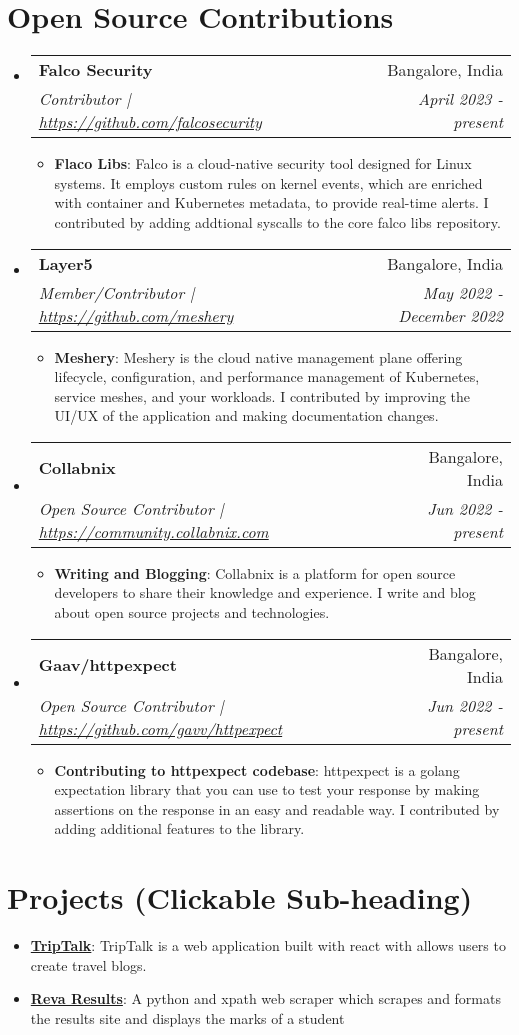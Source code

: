 \documentclass[letterpaper,11pt]{article}
\makeatletter
\newcommand{\resumeItem}[2]{
  \item\small{
    \textbf{#1}{: #2 \vspace{-2pt}}
  }
}
\newcommand{\resumeSubheading}[4]{
  \vspace{-1pt}\item
    \begin{tabular*}{0.97\textwidth}{l@{\extracolsep{\fill}}r}
      \textbf{#1} & #2 \\
      \textit{\small#3} & \textit{\small #4} \\
    \end{tabular*}\vspace{-5pt}
}
\newcommand{\resumeSubItem}[2]{\resumeItem{#1}{#2}\vspace{-4pt}}
\newcommand{\resumeSubHeadingListStart}{\begin{itemize}[leftmargin=*]}
\newcommand{\resumeSubHeadingListEnd}{\end{itemize}}
\newcommand{\resumeItemListStart}{\begin{itemize}}
\newcommand{\resumeItemListEnd}{\end{itemize}\vspace{-5pt}}
\makeatother
\begin{document}
\section{Open Source Contributions}  
\resumeSubHeadingListStart
\resumeSubheading
  {Falco Security }{Bangalore, India}
  {Contributor | \href{https://github.com/falcosecurity}{https://github.com/falcosecurity}}{April 2023 - present}
  \resumeItemListStart
  \resumeItem{Flaco Libs} 
   {Falco is a cloud-native security tool designed for Linux systems. It employs custom rules on kernel events, which are enriched with container and Kubernetes metadata, to provide real-time alerts.
  I contributed by adding addtional syscalls to the core falco libs repository.}
\resumeItemListEnd
  \resumeSubheading
  {Layer5}{Bangalore, India}
  {Member/Contributor | \href{https://github.com/meshery}{https://github.com/meshery} }{May 2022 - December 2022}
  \resumeItemListStart
  \resumeItem{Meshery}
  {Meshery is the cloud native management plane offering lifecycle, configuration, and performance management of Kubernetes, service meshes, and your workloads. I contributed by improving the UI/UX of the application and making documentation changes.}
\resumeItemListEnd
\resumeSubheading
  {Collabnix  }{Bangalore, India}
  {Open Source Contributor | \href{https://community.collabnix.com}{https://community.collabnix.com}}{Jun 2022 - present}
  \resumeItemListStart
  \resumeItem{Writing and Blogging}
  {Collabnix is a platform for open source developers to share their knowledge and experience. I write and blog about open source projects and technologies.}
\resumeItemListEnd 
\resumeSubheading
  {Gaav/httpexpect}{Bangalore, India}
  {Open Source Contributor | \href{https://github.com/gavv/httpexpect}{https://github.com/gavv/httpexpect}}{Jun 2022 - present}
  \resumeItemListStart
  \resumeItem{Contributing to httpexpect codebase}
  {httpexpect is a golang expectation library that you can use to test your response by making assertions on the response in an easy and readable way.
  I contributed by adding additional features to the library.}
\resumeItemListEnd 
\resumeSubHeadingListEnd
\section{Projects (Clickable Sub-heading)}
  \resumeSubHeadingListStart
    \resumeSubItem{\href{https://triptalk-production.web.app/home}{TripTalk}}
      {TripTalk is a  web application built with react with allows users to create travel blogs.}
    \resumeSubItem{\href{https://github.com/rohith-raju/Reva-results}{Reva Results}}
    {
    A python and xpath web scraper which scrapes and formats the results site and displays the marks of a student 
    }
  \resumeSubHeadingListEnd
\end{document}
